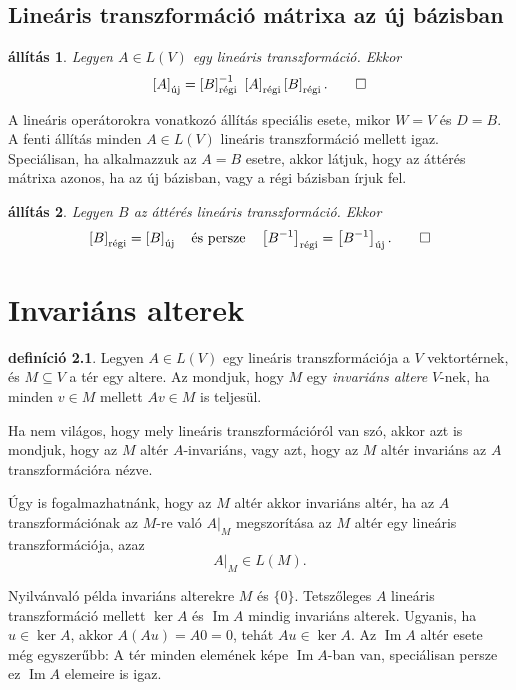 \documentclass[9pt, a4paper, showtrims]{memoir}
\makeatletter
\renewenvironment{proof}[1][\proofname]
    {\par\pushQED{\qed}%
    \normalfont \topsep6\p@\@plus6\p@\relax
    \trivlist
    \item[\hskip\labelsep
        \itshape
    #1\@addpunct{:}]\ignorespaces}
    {\popQED\endtrivlist\@endpefalse}
\theoremstyle{plain}
\newtheorem{proposition}{állítás}[chapter]
\theoremstyle{remark}
\theoremstyle{definition}
\newtheorem{definition}[proposition]{definíció}
\DeclareMathOperator{\im}{Im}
\newcommand{\uj}{\text{új}}
\newcommand{\rgi}{\text{régi}}
\makeatother
\begin{document}
\section{Lineáris transzformáció mátrixa az új bázisban}
\begin{proposition}
    Legyen $A\in L\left( V \right)$ egy lineáris transzformáció.
    Ekkor 
    \[
        \left[ A \right]_{\uj}
        =
        \left[ B \right]^{-1}_\rgi\
        \left[ A \right]_\rgi
        \left[ B \right]_\rgi.\qedhere
    \]
\end{proposition}
\begin{proof}
    A lineáris operátorokra vonatkozó állítás speciális esete,
    mikor $W=V$ és $D=B$.
\end{proof}
A fenti állítás minden $A\in L\left( V \right)$ lineáris transzformáció mellett igaz.
Speciálisan, ha alkalmazzuk az $A=B$ esetre, akkor látjuk, 
hogy az áttérés mátrixa azonos, ha az új bázisban, vagy a régi bázisban írjuk fel.
\begin{proposition}
    Legyen $B$ az áttérés lineáris transzformáció.
    Ekkor
    \[
        \left[ B \right]_\rgi=\left[ B \right]_\uj
        \quad\text{és persze}\quad
        \left[ B^{-1} \right]_\rgi=\left[ B^{-1} \right]_\uj.\qedhere
    \]
\end{proposition}

\chapter{Invariáns alterek}
\begin{definition}
    Legyen $A\in L\left( V \right)$ egy lineáris transzformációja a $V$ vektortérnek,
    és $M\subseteq V$ a tér egy altere.
    Az mondjuk, hogy $M$ egy \emph{invariáns altere}
    $V$-nek, ha minden $v\in M$ mellett $Av\in M$ is teljesül.
\end{definition}
Ha nem világos, hogy mely lineáris transzformációról van szó,
akkor azt is mondjuk, hogy az $M$ altér $A$-invariáns, vagy azt,
hogy az $M$ altér invariáns az $A$ transzformációra nézve.

Úgy is fogalmazhatnánk, hogy az $M$ altér akkor invariáns altér,
ha az $A$ transzformációnak az $M$-re való $A|_M$ megszorítása az $M$
altér egy lineáris transzformációja, azaz
\[
    A|_M\in L\left( M \right).
\]

Nyilvánvaló példa invariáns alterekre $M$ és $\{0\}$.
Tetszőleges $A$ lineáris transzformáció mellett $\ker A$ és $\im A$ mindig invariáns alterek.
Ugyanis, ha $u\in\ker A$, akkor $A\left( Au \right)=A0=0$, tehát $Au\in\ker A$.
Az $\im A$ altér esete még egyszerűbb: A tér minden elemének képe $\im A$-ban van, speciálisan persze ez $\im A$ elemeire is igaz.
\end{document}
